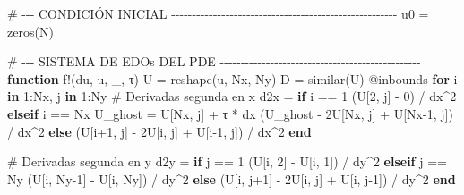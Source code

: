 \documentclass[
  spanish,
  us-letterpaper,
  DIV=11,
  numbers=noendperiod]{scrreprt}
\newenvironment{Shaded}{\begin{snugshade}}{\end{snugshade}}
\newcommand{\CommentTok}[1]{\textcolor[rgb]{0.37,0.37,0.37}{#1}}
\newcommand{\ControlFlowTok}[1]{\textcolor[rgb]{0.00,0.23,0.31}{\textbf{#1}}}
\newcommand{\FloatTok}[1]{\textcolor[rgb]{0.68,0.00,0.00}{#1}}
\newcommand{\FunctionTok}[1]{\textcolor[rgb]{0.28,0.35,0.67}{#1}}
\newcommand{\KeywordTok}[1]{\textcolor[rgb]{0.00,0.23,0.31}{\textbf{#1}}}
\newcommand{\NormalTok}[1]{\textcolor[rgb]{0.00,0.23,0.31}{#1}}
\newcommand{\OperatorTok}[1]{\textcolor[rgb]{0.37,0.37,0.37}{#1}}
\newcommand{\PreprocessorTok}[1]{\textcolor[rgb]{0.68,0.00,0.00}{#1}}
\theoremstyle{definition}
\theoremstyle{plain}
\theoremstyle{remark}
\begin{document}
\begin{Shaded}
\begin{Highlighting}[]
\CommentTok{\# {-}{-}{-} CONDICIÓN INICIAL {-}{-}{-}{-}{-}{-}{-}{-}{-}{-}{-}{-}{-}{-}{-}{-}{-}{-}{-}{-}{-}{-}{-}{-}{-}{-}{-}{-}{-}{-}{-}{-}{-}{-}{-}{-}{-}{-}{-}{-}{-}{-}{-}{-}{-}{-}{-}{-}{-}{-}{-}{-}{-}{-}}
\NormalTok{u0 }\OperatorTok{=} \FunctionTok{zeros}\NormalTok{(N)}

\CommentTok{\# {-}{-}{-} SISTEMA DE EDOs DEL PDE {-}{-}{-}{-}{-}{-}{-}{-}{-}{-}{-}{-}{-}{-}{-}{-}{-}{-}{-}{-}{-}{-}{-}{-}{-}{-}{-}{-}{-}{-}{-}{-}{-}{-}{-}{-}{-}{-}{-}{-}{-}{-}{-}{-}{-}{-}{-}{-}}
\KeywordTok{function} \FunctionTok{f!}\NormalTok{(du, u, \_, τ)}
\NormalTok{    U }\OperatorTok{=} \FunctionTok{reshape}\NormalTok{(u, Nx, Ny)}
\NormalTok{    D }\OperatorTok{=} \FunctionTok{similar}\NormalTok{(U)}
    \PreprocessorTok{@inbounds} \ControlFlowTok{for}\NormalTok{ i }\KeywordTok{in} \FloatTok{1}\OperatorTok{:}\NormalTok{Nx, j }\KeywordTok{in} \FloatTok{1}\OperatorTok{:}\NormalTok{Ny}
        \CommentTok{\# Derivadas segunda en x}
\NormalTok{        d2x }\OperatorTok{=} \ControlFlowTok{if}\NormalTok{ i }\OperatorTok{==} \FloatTok{1}
\NormalTok{            (U[}\FloatTok{2}\NormalTok{, j] }\OperatorTok{{-}} \FloatTok{0}\NormalTok{) }\OperatorTok{/}\NormalTok{ dx}\OperatorTok{\^{}}\FloatTok{2}
        \ControlFlowTok{elseif}\NormalTok{ i }\OperatorTok{==}\NormalTok{ Nx}
\NormalTok{            U\_ghost }\OperatorTok{=}\NormalTok{ U[Nx, j] }\OperatorTok{+}\NormalTok{ τ }\OperatorTok{*}\NormalTok{ dx}
\NormalTok{            (U\_ghost }\OperatorTok{{-}} \FloatTok{2}\NormalTok{U[Nx, j] }\OperatorTok{+}\NormalTok{ U[Nx}\OperatorTok{{-}}\FloatTok{1}\NormalTok{, j]) }\OperatorTok{/}\NormalTok{ dx}\OperatorTok{\^{}}\FloatTok{2}
        \ControlFlowTok{else}
\NormalTok{            (U[i}\OperatorTok{+}\FloatTok{1}\NormalTok{, j] }\OperatorTok{{-}} \FloatTok{2}\NormalTok{U[i, j] }\OperatorTok{+}\NormalTok{ U[i}\OperatorTok{{-}}\FloatTok{1}\NormalTok{, j]) }\OperatorTok{/}\NormalTok{ dx}\OperatorTok{\^{}}\FloatTok{2}
        \ControlFlowTok{end}

        \CommentTok{\# Derivadas segunda en y}
\NormalTok{        d2y }\OperatorTok{=} \ControlFlowTok{if}\NormalTok{ j }\OperatorTok{==} \FloatTok{1}
\NormalTok{            (U[i, }\FloatTok{2}\NormalTok{] }\OperatorTok{{-}}\NormalTok{ U[i, }\FloatTok{1}\NormalTok{]) }\OperatorTok{/}\NormalTok{ dy}\OperatorTok{\^{}}\FloatTok{2}
        \ControlFlowTok{elseif}\NormalTok{ j }\OperatorTok{==}\NormalTok{ Ny}
\NormalTok{            (U[i, Ny}\OperatorTok{{-}}\FloatTok{1}\NormalTok{] }\OperatorTok{{-}}\NormalTok{ U[i, Ny]) }\OperatorTok{/}\NormalTok{ dy}\OperatorTok{\^{}}\FloatTok{2}
        \ControlFlowTok{else}
\NormalTok{            (U[i, j}\OperatorTok{+}\FloatTok{1}\NormalTok{] }\OperatorTok{{-}} \FloatTok{2}\NormalTok{U[i, j] }\OperatorTok{+}\NormalTok{ U[i, j}\OperatorTok{{-}}\FloatTok{1}\NormalTok{]) }\OperatorTok{/}\NormalTok{ dy}\OperatorTok{\^{}}\FloatTok{2}
        \ControlFlowTok{end}


\end{Highlighting}
\end{Shaded}
\end{document}
